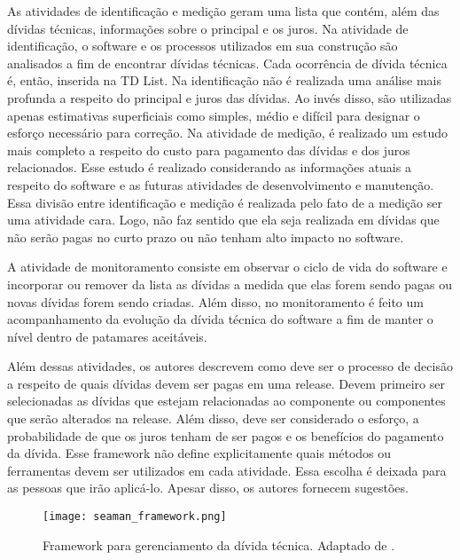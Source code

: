 As atividades de identificação e medição geram uma lista que contém, além das dívidas técnicas, informações sobre o principal e os juros. Na atividade de identificação, o software e os processos utilizados em sua construção são analisados a fim de encontrar dívidas técnicas. Cada ocorrência de dívida técnica é, então, inserida na TD List. Na identificação não é realizada uma análise mais profunda a respeito do principal e juros das dívidas. Ao invés disso, são utilizadas apenas estimativas superficiais como  simples, médio e difícil para designar o esforço necessário para correção. Na atividade de medição, é realizado um estudo mais completo a respeito do custo para pagamento das dívidas e dos juros relacionados. Esse estudo é realizado considerando as informações atuais a respeito do software e as futuras atividades de desenvolvimento e manutenção. Essa divisão entre identificação e medição é realizada pelo fato de a medição ser uma atividade cara. Logo, não faz sentido que ela seja realizada em dívidas que não serão pagas no curto prazo ou não tenham alto impacto no software. 

A atividade de monitoramento consiste em observar o ciclo de vida do software e incorporar ou remover da lista as dívidas a medida que elas forem sendo pagas ou novas dívidas forem sendo criadas.  Além disso, no monitoramento é feito um acompanhamento da evolução da dívida técnica do software a fim de manter o nível dentro de patamares aceitáveis.

 Além dessas atividades, os autores descrevem como deve ser o processo de decisão a respeito de quais dívidas devem ser pagas em uma release. Devem primeiro ser selecionadas as dívidas que estejam relacionadas ao componente ou componentes que serão alterados na release. Além disso, deve ser considerado o esforço, a probabilidade de que os juros tenham de ser pagos e os benefícios do pagamento da dívida. Esse framework não define explicitamente quais métodos ou ferramentas devem ser utilizados em cada atividade. Essa escolha é deixada para as pessoas que irão aplicá-lo. Apesar disso, os autores fornecem sugestões.


\begin{figure}[!h]
  \centering
  \texttt{[image: seaman\_framework.png]} 
  \caption{Framework para gerenciamento da dívida técnica. Adaptado de \cite{seaman2011measuring}.  }
  \label{fig:seaman_framework} 
\end{figure}


